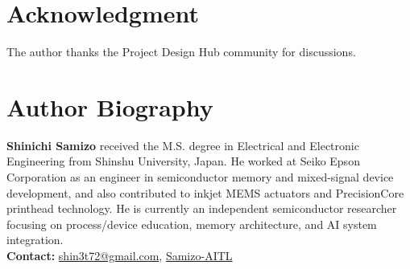 \documentclass[conference]{IEEEtran}
\begin{document}
\section*{Acknowledgment}
The author thanks the Project Design Hub community for discussions.




\vspace{1ex}
\section*{Author Biography}
\vspace{-0.5ex}
\noindent\textbf{Shinichi Samizo} received the M.S. degree in Electrical and Electronic Engineering from Shinshu University, Japan.
He worked at Seiko Epson Corporation as an engineer in semiconductor memory and mixed-signal device development,
and also contributed to inkjet MEMS actuators and PrecisionCore printhead technology.
He is currently an independent semiconductor researcher focusing on process/device education,
memory architecture, and AI system integration.\\[1ex]
\textbf{Contact:} \href{mailto:shin3t72@gmail.com}{shin3t72@gmail.com}, \href{https://github.com/Samizo-AITL}{Samizo-AITL}
\end{document}
